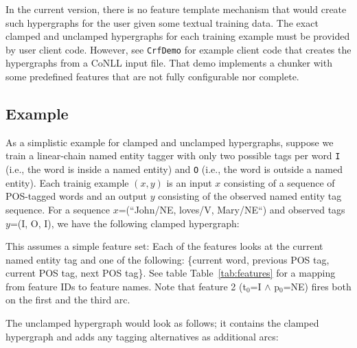 \documentclass[12pt]{article}
\newcommand{\yellowlisting}[1]{%
  }
\newcommand{\tabref}[1]{Table~\ref{tab:#1}}
\begin{document}
In the current version, there is no feature template mechanism that
would create such hypergraphs for the user given some textual training
data. The exact clamped and unclamped hypergraphs for each training
example must be provided by user client code. However, see
\texttt{CrfDemo} for example client code that creates the hypergraphs
from a CoNLL input file. That demo implements a chunker with some
predefined features that are not fully configurable nor complete.

\subsection{Example}

As a simplistic example for clamped and unclamped hypergraphs, suppose
we train a linear-chain named entity tagger with only two possible
tags per word \texttt{I} (i.e., the word is inside a named entity) and
\texttt{O} (i.e., the word is outside a named entity).  Each trainig
example $(x,y)$ is an input $x$ consisting of a sequence of POS-tagged
words and an output $y$ consisting of the observed named entity tag
sequence. For a sequence $x$=(``John\slash NE, loves\slash V,
Mary\slash NE``) and observed tags $y$=(I, O, I), we have the
following clamped hypergraph: \yellowlisting{fig/clamped.hyp}

This assumes a simple feature set: Each of the features looks at the
current named entity tag and one of the following: \{current word,
  previous POS tag, current POS tag, next POS tag\}. See table
\tabref{features} for a mapping from feature IDs to feature
names. Note that feature 2 (t$_0$=I $\land$ p$_{0}$=NE) fires both on
the first and the third arc.

\noindent The unclamped hypergraph would look as follows; it contains
the clamped hypergraph and adds any tagging alternatives as additional
arcs: \yellowlisting{fig/unclamped.hyp}
\end{document}
